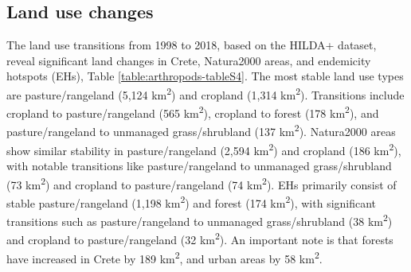     \subsection{Land use changes}
    \label{subsec:arthropods-human-intervention}
The land use transitions from 1998 to 2018, based on the HILDA+ dataset, reveal
significant land changes in Crete, Natura2000 areas, and endemicity hotspots (EHs), Table \ref{table:arthropods-tableS4}.
The most stable land use types are pasture/rangeland (5,124 km\textsuperscript{2})
and cropland (1,314 km\textsuperscript{2}).
Transitions include cropland to pasture/rangeland (565 km\textsuperscript{2}),
cropland to forest (178 km\textsuperscript{2}), and pasture/rangeland to
unmanaged grass/shrubland (137 km\textsuperscript{2}).
Natura2000 areas show similar stability in pasture/rangeland (2,594 km\textsuperscript{2})
and cropland (186 km\textsuperscript{2}), with notable transitions like
pasture/rangeland to unmanaged grass/shrubland (73 km\textsuperscript{2}) and
cropland to pasture/rangeland (74 km\textsuperscript{2}).
EHs primarily consist of stable pasture/rangeland (1,198 km\textsuperscript{2})
and forest (174 km\textsuperscript{2}), with significant transitions such as
pasture/rangeland to unmanaged grass/shrubland (38 km\textsuperscript{2}) and
cropland to pasture/rangeland (32 km\textsuperscript{2}).
An important note is that forests have increased in Crete by 189 km\textsuperscript{2}, 
and urban areas by 58 km\textsuperscript{2}. 

